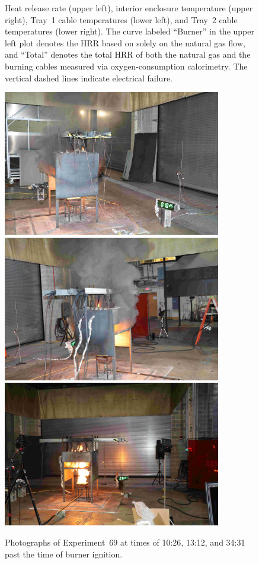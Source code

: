 \begin{figure}[H]
\caption[HRR and temperatures of Experiment 69]{Heat release rate (upper left), interior enclosure temperature (upper right), Tray~1 cable temperatures (lower left), and Tray~2 cable temperatures (lower right). The curve labeled ``Burner'' in the upper left plot denotes the HRR based on solely on the natural gas flow, and ``Total'' denotes the total HRR of both the natural gas and the burning cables measured via oxygen-consumption calorimetry. The vertical dashed lines indicate electrical failure.}
\label{fig:Test_69}
\end{figure}

\begin{figure}[p]
\centering
\includegraphics[height=2.50in]{../FIGURES/Test_69_Photo_1} \\ \vspace{0.1in}
\includegraphics[height=2.50in]{../FIGURES/Test_69_Photo_2} \\ \vspace{0.1in}
\includegraphics[height=2.50in]{../FIGURES/Test_69_Photo_3}
\caption[Photographs of Experiment~69]{Photographs of Experiment~69 at times of 10:26, 13:12, and 34:31 past the time of burner ignition.}
\label{fig:Test_69_photos}
\end{figure}



